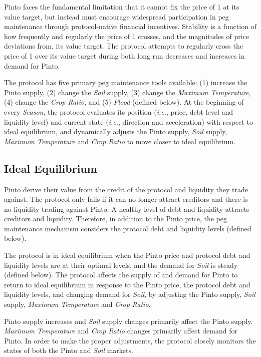 \documentclass[tikz]{article}
\newcommand{\term}[1]{\textsl{#1}}
\newcommand{\Pinto}{} %
\begin{document}
Pinto faces the fundamental limitation that it cannot fix the price of \Pinto1 at its value target, but instead must encourage widespread participation in peg maintenance through protocol-native financial incentives. Stability is a function of how frequently and regularly the price of \Pinto1 crosses, and the magnitudes of price deviations from, its value target. The protocol attempts to regularly cross the price of \Pinto1 over its value target during both long run decreases and increases in demand for Pinto.

The protocol has five primary peg maintenance tools available: (1) increase the Pinto supply, (2) change the \term{Soil} supply, (3) change the \term{Maximum Temperature}, (4) change the \term{Crop Ratio}, and (5) \term{Flood} (defined below). At the beginning of every \term{Season}, the protocol evaluates its position (\textit{i.e.}, price, debt level and liquidity level) and current state (\textit{i.e.}, direction and acceleration) with respect to ideal equilibrium, and dynamically adjusts the Pinto supply, \term{Soil} supply, \term{Maximum Temperature} and \term{Crop Ratio} to move closer to ideal equilibrium.


\subsection{Ideal Equilibrium}

Pinto derive their value from the credit of the protocol and liquidity they trade against. The protocol only fails if it can no longer attract creditors and there is no liquidity trading against Pinto. A healthy level of debt and liquidity attracts creditors and liquidity. Therefore, in addition to the Pinto price, the peg maintenance mechanism considers the protocol debt and liquidity levels (defined below). 

The protocol is in ideal equilibrium when the Pinto price and protocol debt and liquidity levels are at their optimal levels, and the demand for \term{Soil} is steady (defined below). The protocol affects the supply of and demand for Pinto to return to ideal equilibrium in response to the Pinto price, the protocol debt and liquidity levels, and changing demand for \term{Soil}, by adjusting the Pinto supply, \term{Soil} supply, \term{Maximum Temperature} and \term{Crop Ratio}. 

Pinto supply increases and \term{Soil} supply changes primarily affect the Pinto supply. \term{Maximum Temperature} and \term{Crop Ratio} changes primarily affect demand for Pinto. In order to make the proper adjustments, the protocol closely monitors the states of both the Pinto and \term{Soil} markets.
\end{document}
